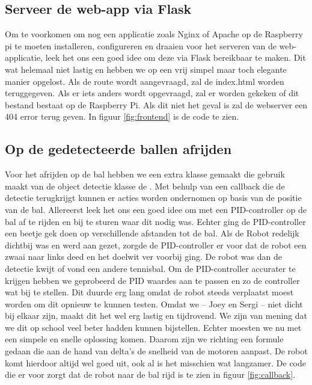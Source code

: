 \subsection{Serveer de web-app via Flask}
Om te voorkomen om nog een applicatie zoals Nginx of Apache op de Raspberry pi te moeten installeren, configureren en draaien voor het serveren van de web-applicatie, leek het ons een goed idee om deze via Flask bereikbaar te maken. Dit wat helemaal niet lastig en hebben we op een vrij simpel maar toch elegante manier opgelost. Als de route \quotes{/} wordt aangevraagd, zal de index.html worden teruggegeven. Als er iets anders wordt opgevraagd, zal er worden gekeken of dit bestand bestaat op de Raspberry Pi. Als dit niet het geval is zal de webserver een 404 error terug geven. In figuur \ref{fig:frontend} is de code te zien.\\ 

\subsection{Op de gedetecteerde ballen afrijden}
Voor het afrijden op de bal hebben we een extra klasse gemaakt die gebruik maakt van de object detectie klasse de . Met behulp van een callback die de detectie terugkrijgt kunnen er acties worden ondernomen op basis van de positie van de bal. Allereerst leek het ons een goed idee om met een PID-controller op de bal af te rijden en bij te sturen waar dit nodig was. Echter ging de PID-controller een beetje gek doen op verschillende afstanden tot de bal. Als de Robot redelijk dichtbij was en werd aan gezet, zorgde de PID-controller er voor dat de robot een zwaai naar links deed en het doelwit ver voorbij ging. De robot was dan de detectie kwijt of vond een andere tennisbal. Om de PID-controller accurater te krijgen hebben we geprobeerd de PID waardes aan te passen en zo de controller wat bij te stellen. Dit duurde erg lang omdat de robot steeds verplaatst moest worden om dit opnieuw te kunnen testen. Omdat we -- Joey en Sergi -- niet dicht bij elkaar zijn, maakt dit het wel erg lastig en tijdrovend. We zijn van mening dat we dit op school veel beter hadden kunnen bijstellen. Echter moesten we nu met een simpele en snelle oplossing komen. Daarom zijn we richting een formule gedaan die aan de hand van delta's de snelheid van de motoren aanpast. De robot komt hierdoor altijd wel goed uit, ook al is het misschien wat langzamer. De code die er voor zorgt dat de robot naar de bal rijd is te zien in figuur \ref{fig:callback}.\\

